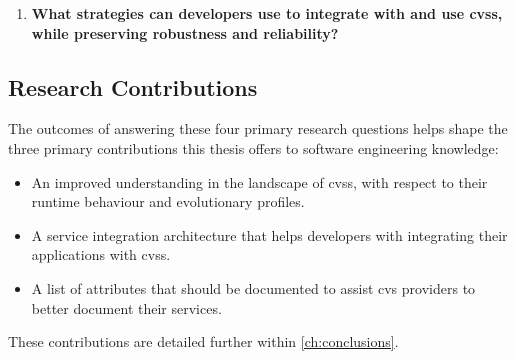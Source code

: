 \begin{leftbar}
\begin{enumerate}[label=\faQuestionCircle~~\textbf{RQ\arabic*.}, ref=RQ\arabic*, leftmargin=2.75\parindent, rightmargin=1\parindent,start=4]
  \item \textbf{What strategies can developers use to integrate with and use \glspl{cvs}, while preserving robustness and reliability?}\label{rq:fse}%
\end{enumerate}
\end{leftbar}



\subsection{Research Contributions}



The outcomes of answering these four primary research questions helps shape the three primary contributions this thesis offers to software engineering knowledge:

\begin{itemize}
  \item An improved understanding in the landscape of \glspl{cvs}, with respect to their runtime behaviour and evolutionary profiles.
  \item A service integration architecture that helps developers with integrating their applications with \glspl{cvs}.
  \item A list of attributes that should be documented to assist \gls{cvs} providers to better document their services.
\end{itemize}

\noindent
These contributions are detailed further within \cref{ch:conclusions}.

